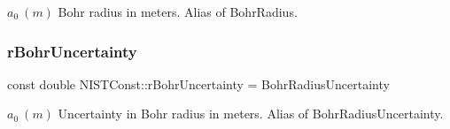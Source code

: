 $a_0 \ (m)$ Bohr radius in meters. Alias of Bohr\+Radius. \mbox{\label{group___n_i_s_t_const-_bohr_radius_ga5cbe12af6cb3e4962e629970564c7905}} 
\subsubsection{\texorpdfstring{r\+Bohr\+Uncertainty}{rBohrUncertainty}}
{\footnotesize\ttfamily const double N\+I\+S\+T\+Const\+::r\+Bohr\+Uncertainty = Bohr\+Radius\+Uncertainty}

$a_0 \ (m)$ Uncertainty in Bohr radius in meters. Alias of Bohr\+Radius\+Uncertainty. 